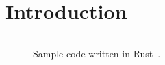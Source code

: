 \section*{Introduction}
\begin{figure}[h]
	\inputminted[linenos]{rust}{source_code/src/main.rs}
	\caption{Sample code written in Rust~\cite{matsakisRustLanguage2014}.}
\end{figure}